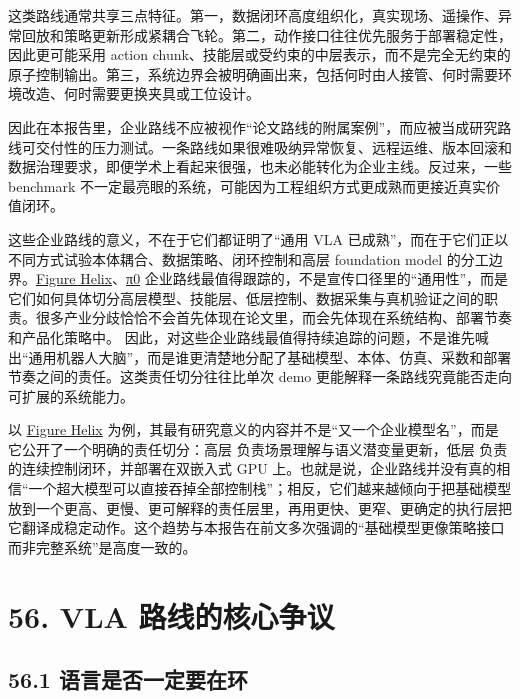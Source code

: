 这类路线通常共享三点特征。第一，数据闭环高度组织化，真实现场、遥操作、异常回放和策略更新形成紧耦合飞轮。第二，动作接口往往优先服务于部署稳定性，因此更可能采用 action chunk、技能层或受约束的中层表示，而不是完全无约束的原子控制输出。第三，系统边界会被明确画出来，包括何时由人接管、何时需要环境改造、何时需要更换夹具或工位设计。

因此在本报告里，企业路线不应被视作“论文路线的附属案例”，而应被当成研究路线可交付性的压力测试。一条路线如果很难吸纳异常恢复、远程运维、版本回滚和数据治理要求，即便学术上看起来很强，也未必能转化为企业主线。反过来，一些 benchmark 不一定最亮眼的系统，可能因为工程组织方式更成熟而更接近真实价值闭环。

这些企业路线的意义，不在于它们都证明了“通用 VLA 已成熟”，而在于它们正以不同方式试验本体耦合、数据策略、闭环控制和高层 foundation model 的分工边界。\href{https://www.figure.ai/news/helix}{Figure Helix}、\href{https://www.pi.website/blog/pi0}{π0} 企业路线最值得跟踪的，不是宣传口径里的“通用性”，而是它们如何具体切分高层模型、技能层、低层控制、数据采集与真机验证之间的职责。很多产业分歧恰恰不会首先体现在论文里，而会先体现在系统结构、部署节奏和产品化策略中。 因此，对这些企业路线最值得持续追踪的问题，不是谁先喊出“通用机器人大脑”，而是谁更清楚地分配了基础模型、本体、仿真、采数和部署节奏之间的责任。这类责任切分往往比单次 demo 更能解释一条路线究竟能否走向可扩展的系统能力。

以 \href{https://www.figure.ai/news/helix}{Figure Helix} 为例，其最有研究意义的内容并不是“又一个企业模型名”，而是它公开了一个明确的责任切分：高层 \texttt{} 负责场景理解与语义潜变量更新，低层 \texttt{} 负责 \texttt{} 的连续控制闭环，并部署在双嵌入式 GPU 上。也就是说，企业路线并没有真的相信“一个超大模型可以直接吞掉全部控制栈”；相反，它们越来越倾向于把基础模型放到一个更高、更慢、更可解释的责任层里，再用更快、更窄、更确定的执行层把它翻译成稳定动作。这个趋势与本报告在前文多次强调的“基础模型更像策略接口而非完整系统”是高度一致的。

\section*{56. VLA 路线的核心争议}

\subsection*{56.1 语言是否一定要在环}


